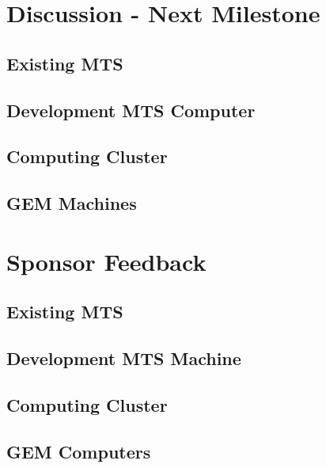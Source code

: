 \documentclass[12pt]{article}
\newcommand\tab[1][1cm]{\hspace*{#1}}
\begin{document}
\section{Discussion - Next Milestone}

\subsection{Existing MTS}

\tab 

\subsection{Development MTS Computer}



\subsection{Computing Cluster}



\subsection{GEM Machines}


\section{Sponsor Feedback}

\subsection{Existing MTS}

\vspace{1in}

\subsection{Development MTS Machine}

\vspace{1in}

\subsection{Computing Cluster}

\vspace{1in}

\subsection{GEM Computers}
\end{document}
